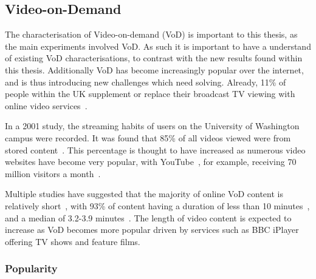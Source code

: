 \subsection{Video-on-Demand}

    The characterisation of Video-on-demand (VoD) is important to this thesis, as the main experiments involved VoD. As such it is important to have a understand of existing VoD characterisations, to contrast with the new results found within this thesis. Additionally VoD has become increasingly popular over the internet, and is thus introducing new challenges which need solving. Already, 11\% of people within the UK supplement or replace their broadcast TV viewing with online video services~\cite{YouGov2008red}.

    In a 2001 study, the streaming habits of users on the University of Washington campus were recorded. It was found that 85\% of all videos viewed were from stored content~\cite{chesire2001maa}. This percentage is thought to have increased as numerous video websites have become very popular, with YouTube~\cite{youtube}, for example, receiving 70 million visitors a month~\cite{saxena2008avs}.

    Multiple studies have suggested that the majority of online VoD content is relatively short~\cite{li2005csm}, with 93\% of content having a duration of less than 10 minutes~\cite{chesire2001maa}, and a median of 3.2-3.9 minutes~\cite{saxena2008avs}. The length of video content is expected to increase as VoD becomes more popular driven by services such as BBC iPlayer~\cite{iplayer} offering TV shows and feature films.


\subsubsection{Popularity}

